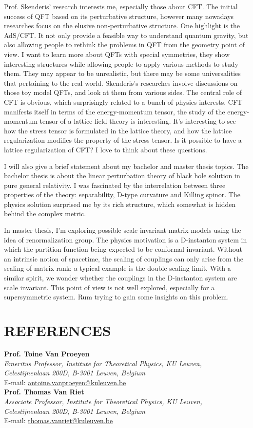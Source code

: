 Prof. Skenderis' research interests me, especially those about CFT.
The initial success of QFT based on its perturbative structure,
however many nowadays researches focus on the elusive non-perturbative structure.
One highlight is the AdS/CFT.
It not only provide a feasible way to understand quantum gravity,
but also allowing people to rethink the problems in QFT from the geometry point of view.
I want to learn more about QFTs with special symmetries,
they show interesting structures while allowing people to apply various methods to study them.
They may appear to be unrealistic,
but there may be some universalities that pertaining to the real world.
Skenderis's researches involve discussions on those toy model QFTs, 
and look at them from various sides.
The central role of CFT is obvious, which surprisingly related to a bunch of physics interests.
CFT manifests itself in terms of the energy-momentum tensor, 
the study of the energy-momentum tensor of a lattice field theory is interesting.
It's interesting to see how the stress tensor is formulated in the lattice theory, and how the lattice regularization modifies the property of the stress tensor.
Is it possible to have a lattice regularization of CFT?
I love to think about these questions.

I will also give a brief statement about my bachelor and master thesis topics. 
The bachelor thesis is about the linear perturbation theory of black hole solution in pure general relativity. 
I was fascinated by the interrelation between three properties of the theory: 
separability, D-type curvature and Killing spinor. 
The physics solution surprised me by its rich structure, 
which somewhat is hidden behind the complex metric.

In master thesis, I'm exploring possible scale invariant matrix models using the idea of renormalization group.
The physics motivation is a D-instanton system in which the partition function being expected to be conformal invariant. 
Without an intrinsic notion of spacetime, the scaling of couplings can only arise from the scaling of matrix rank: 
a typical example is the double scaling limit. 
With a similar spirit, we wonder whether the couplings in the D-instanton system are scale invariant. 
This point of view is not well explored, especially for a supersymmetric system. Rum trying to gain some insights on this problem.

\section*{REFERENCES}
\textbf{Prof. Toine Van Proeyen}\\
\textit{Emeritus Professor,  Institute for Theoretical Physics,  KU Leuven,  Celestijnenlaan 200D, B-3001 Leuven,  Belgium}\\
E-mail: \href{antoine.vanproeyen@kuleuven.be}{antoine.vanproeyen@kuleuven.be}\\
\textbf{Prof. Thomas Van Riet}\\
\textit{Associate Professor,  Institute for Theoretical Physics,  KU Leuven,  Celestijnenlaan 200D, B-3001 Leuven,  Belgium}\\
E-mail: \href{thomas.vanriet@kuleuven.be}{thomas.vanriet@kuleuven.be}

